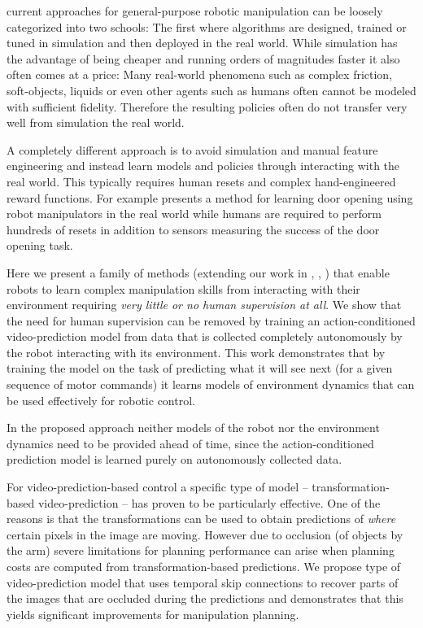 
current approaches for general-purpose robotic manipulation can be loosely categorized into two schools: The first where algorithms are designed, trained or tuned in simulation and then deployed in the real world. While simulation has the advantage of being cheaper and running orders of magnitudes faster it also often comes at a price: Many real-world phenomena such as complex friction, soft-objects, liquids or even other agents such as humans often cannot be modeled with sufficient fidelity. Therefore the resulting policies often do not transfer very well from simulation the real world.

A completely different approach is to avoid simulation and manual feature engineering and instead learn models and policies through interacting with the real world. This typically requires human resets and complex hand-engineered reward functions. For example \cite{DBLP:journals/corr/GuHLL16} presents a method for learning door opening using robot manipulators in the real world while humans are required to perform hundreds of resets in addition to sensors measuring the success of the door opening task.

Here we present a family of methods (extending our work in \cite{foresight}, \cite{sna}, ) that enable robots to learn complex manipulation skills from interacting with their environment requiring \emph{very little or no human supervision at all}. We show that the need for human supervision can be removed by training an action-conditioned video-prediction model from data that is collected completely autonomously by the robot interacting with its environment. This work demonstrates that by training the model on the task of predicting what it will see next (for a given sequence of motor commands) it learns models of environment dynamics that can be used effectively for robotic control.

In the proposed approach neither models of the robot nor the environment dynamics need to be provided ahead of time, since the action-conditioned prediction model is learned purely on autonomously collected data.

For video-prediction-based control a specific type of model -- transformation-based video-prediction -- has proven to be particularly effective. One of the reasons is that the transformations can be used to obtain predictions of \emph{where} certain pixels in the image are moving. However due to occlusion (of objects by the arm) severe limitations for planning performance can arise when planning costs are computed from transformation-based predictions. We propose type of video-prediction model that uses temporal skip connections to recover parts of the images that are occluded during the predictions and demonstrates that this yields significant improvements for manipulation planning.\

